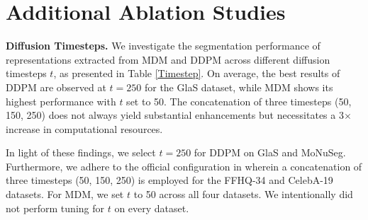 \documentclass{article} \usepackage{iclr2024_conference,times}
\begin{document}
\section{Additional Ablation Studies} \label{ablation}
\textbf{Diffusion Timesteps.} We investigate the segmentation performance of representations extracted from MDM and DDPM across different diffusion timesteps $t$, as presented in Table \ref{Timestep}. On average, the best results of DDPM are observed at $t=250$ for the GlaS dataset, while MDM shows its highest performance with $t$ set to 50. The concatenation of three timesteps (50, 150, 250) does not always yield substantial enhancements but necessitates a 3$\times$ increase in computational resources.

In light of these findings, we select $t=250$ for DDPM on GlaS and MoNuSeg. Furthermore, we adhere to the official configuration in \citet{DBLP:conf/iclr/BaranchukVRKB22} wherein a concatenation of three timesteps (50, 150, 250) is employed for the FFHQ-34 and CelebA-19 datasets.
For MDM, we set $t$ to 50 across all four datasets. We intentionally did not perform tuning for $t$ on every dataset.
\end{document}
